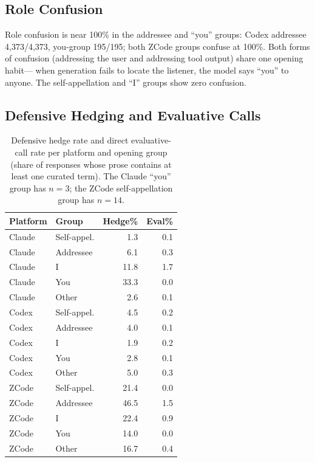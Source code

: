 \documentclass[10pt,twocolumn]{article}
\begin{document}
\subsection{Role Confusion}
Role confusion is near 100\% in the addressee and ``you'' groups: Codex addressee
4{,}373/4{,}373, you-group 195/195; both ZCode groups confuse at 100\%. Both forms
of confusion (addressing the user and addressing tool output) share one opening habit---
when generation fails to locate the listener, the model says ``you'' to anyone. The
self-appellation and ``I'' groups show zero confusion.

\subsection{Defensive Hedging and Evaluative Calls}

\begin{table}[t]
\centering
\small
\setlength{\tabcolsep}{6pt}
\begin{tabular}{llrr}
\toprule
Platform & Group & Hedge\% & Eval\% \\
\midrule
Claude & Self-appel. & 1.3 & 0.1 \\
Claude & Addressee & 6.1 & 0.3 \\
Claude & I & 11.8 & 1.7 \\
Claude & You & 33.3 & 0.0 \\
Claude & Other & 2.6 & 0.1 \\
\midrule
Codex & Self-appel. & 4.5 & 0.2 \\
Codex & Addressee & 4.0 & 0.1 \\
Codex & I & 1.9 & 0.2 \\
Codex & You & 2.8 & 0.1 \\
Codex & Other & 5.0 & 0.3 \\
\midrule
ZCode & Self-appel. & 21.4 & 0.0 \\
ZCode & Addressee & 46.5 & 1.5 \\
ZCode & I & 22.4 & 0.9 \\
ZCode & You & 14.0 & 0.0 \\
ZCode & Other & 16.7 & 0.4 \\
\bottomrule
\end{tabular}
\caption{Defensive hedge rate and direct evaluative-call rate per platform and opening
group (share of responses whose prose contains at least one curated term). The Claude
``you'' group has $n=3$; the ZCode self-appellation group has $n=14$.}
\label{tab:hedge}
\end{table}
\end{document}
